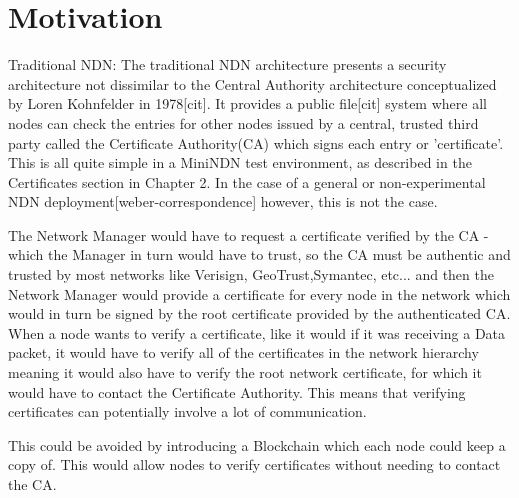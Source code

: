 \section{Motivation}
Traditional NDN: The traditional NDN architecture presents a security architecture not dissimilar to the Central Authority architecture conceptualized by Loren Kohnfelder in 1978[cit]. It provides a public file[cit] system where all nodes can check the entries for other nodes issued by a central, trusted third party called the Certificate Authority(CA) which signs each entry or 'certificate'. This is all quite simple in a MiniNDN test environment, as described in the Certificates section in Chapter 2. In the case of a general or non-experimental NDN deployment[weber-correspondence] however, this is not the case.\par 
The Network Manager would have to request a certificate verified by the CA - which the Manager in turn would have to trust, so the CA must be authentic and trusted by most networks like Verisign, GeoTrust,Symantec, etc... and then the Network Manager would provide a certificate for every node in the network which would in turn be signed by the root certificate provided by the authenticated CA. When a node wants to verify a certificate, like it would if it was receiving a Data packet, it would have to verify all of the certificates in the network hierarchy meaning it would also have to verify the root network certificate, for which it would have to contact the Certificate Authority. This means that verifying certificates can potentially involve a lot of communication.\par 
\vline
This could be avoided by introducing a Blockchain which each node could keep a copy of. This would allow nodes to verify certificates without needing to contact the CA.

